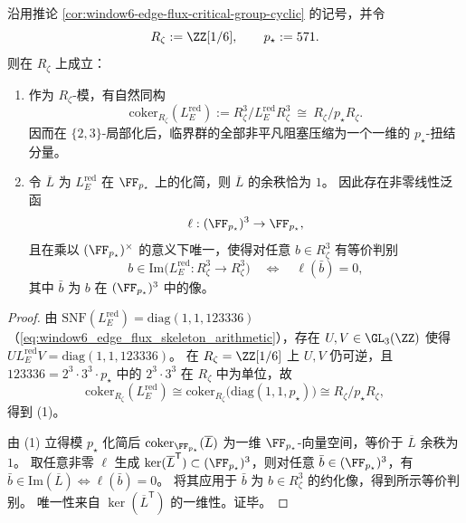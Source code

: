 \begin{theorem}[\(\ZZ\lbrack 1/6\rbrack\)-局部化下的 Kirchhoff--Green 单阶阻塞与 \texorpdfstring{$p_\star=571$}{p*=571}-进刚性]\label{thm:window6-kirchhoff-green-single-order-padic-rigidity}
沿用推论 \ref{cor:window6-edge-flux-critical-group-cyclic} 的记号，并令
\[
R_\zeta:=\ZZ[1/6],
\qquad
p_\star:=571.
\]
则在 \(R_\zeta\) 上成立：
\begin{enumerate}
  \item 作为 \(R_\zeta\)-模，有自然同构
  \[
  \mathrm{coker}_{R_\zeta}(L_E^{\mathrm{red}})
  :=R_\zeta^{3}/L_E^{\mathrm{red}}R_\zeta^{3}
  \ \cong\
  R_\zeta/p_\star R_\zeta.
  \]
  因而在 \(\{2,3\}\)-局部化后，临界群的全部非平凡阻塞压缩为一个一维的 \(p_\star\)-扭结分量。
  \item 令 \(\overline L\) 为 \(L_E^{\mathrm{red}}\) 在 \(\FF_{p_\star}\) 上的化简，则 \(\overline L\) 的余秩恰为 \(1\)。
  因此存在非零线性泛函
  \[
  \ell:(\FF_{p_\star})^3\to \FF_{p_\star},
  \]
  且在乘以 \((\FF_{p_\star})^\times\) 的意义下唯一，使得对任意 \(b\in R_\zeta^3\) 有等价判别
  \[
  b\in \mathrm{Im}\bigl(L_E^{\mathrm{red}}:R_\zeta^3\to R_\zeta^3\bigr)
  \quad\Longleftrightarrow\quad
  \ell(\bar b)=0,
  \]
  其中 \(\bar b\) 为 \(b\) 在 \((\FF_{p_\star})^3\) 中的像。
\end{enumerate}
\end{theorem}

\begin{proof}
由 \(\mathrm{SNF}(L_E^{\mathrm{red}})=\mathrm{diag}(1,1,123336)\)（\eqref{eq:window6_edge_flux_skeleton_arithmetic}），存在 \(U,V\in \GL_3(\ZZ)\) 使得
\(
UL_E^{\mathrm{red}}V=\mathrm{diag}(1,1,123336)
\)。
在 \(R_\zeta=\ZZ[1/6]\) 上 \(U,V\) 仍可逆，且 \(123336=2^3\cdot 3^3\cdot p_\star\) 中的 \(2^3\cdot 3^3\) 在 \(R_\zeta\) 中为单位，故
\[
\mathrm{coker}_{R_\zeta}(L_E^{\mathrm{red}})
\cong
\mathrm{coker}_{R_\zeta}\!\bigl(\mathrm{diag}(1,1,p_\star)\bigr)
\cong
R_\zeta/p_\star R_\zeta,
\]
得到 (1)。
\par
由 (1) 立得模 \(p_\star\) 化简后 \(\mathrm{coker}_{\FF_{p_\star}}(\overline L)\) 为一维 \(\FF_{p_\star}\)-向量空间，等价于 \(\overline L\) 余秩为 \(1\)。
取任意非零 \(\ell\) 生成 \(\ker(\overline L^{\mathsf T})\subset (\FF_{p_\star})^3\)，则对任意 \(\bar b\in(\FF_{p_\star})^3\)，有
\(\bar b\in\mathrm{Im}(\overline L)\iff \ell(\bar b)=0\)。
将其应用于 \(\bar b\) 为 \(b\in R_\zeta^3\) 的约化像，得到所示等价判别。
唯一性来自 \(\ker(\overline L^{\mathsf T})\) 的一维性。证毕。
\end{proof}

